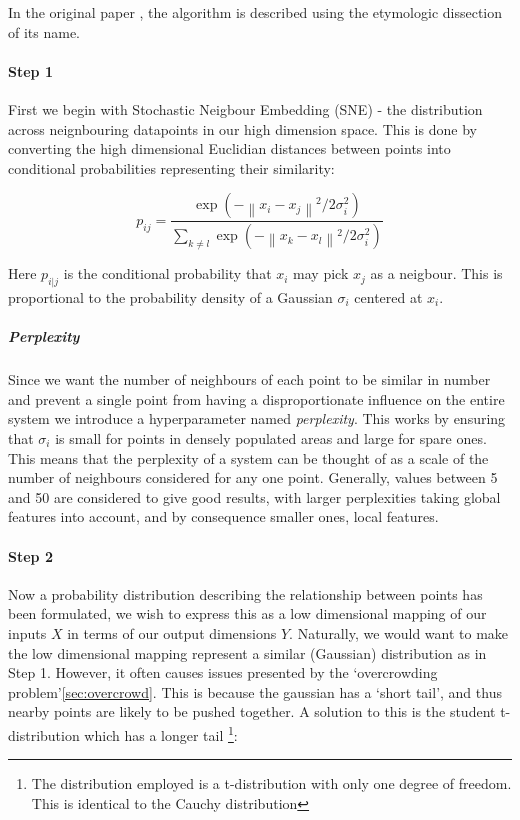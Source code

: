 In the original paper \cite{tsne}, the algorithm is described using the etymologic dissection of its name.

\paragraph{Step 1}
First we begin with Stochastic Neigbour Embedding (SNE) - the distribution across neignbouring datapoints in our high dimension space. This is done by converting the high dimensional Euclidian distances between points into conditional probabilities representing their similarity:

\begin{equation}
p_{ij} = \frac{\exp(-\left \| x_i - x_j \right \|^2 / 2\sigma_i^2)}{\sum_{k \neq l} \exp(- \left \| x_k - x_l \right \|^2 / 2\sigma_i^2)}
\end{equation}

Here $p_{i|j}$ is the conditional probability that $x_i$ may pick $x_j$ as a neigbour. This is proportional to the probability density of a Gaussian $\sigma_i$ centered at $x_i$.

\subparagraph{Perplexity}
Since we want the number of neighbours of each point to be similar in number and prevent a single point from having a disproportionate influence on the entire system we introduce a hyperparameter named \emph{perplexity}. This works by ensuring that $\sigma_i$ is small for points in densely populated areas and large for spare ones. This means that the perplexity of a system can be thought of as a scale of the number of neighbours considered for any one point. Generally, values between 5 and 50 are considered to give good results, with larger perplexities taking global features into account, and by consequence smaller ones, local features.

\paragraph{Step 2}
Now a probability distribution describing the relationship between points has been formulated, we wish to express this as a low dimensional mapping of our inputs $X$ in terms of our output dimensions $Y$. Naturally, we would want to make the low dimensional mapping represent a similar (Gaussian) distribution as in Step 1. However, it often causes issues presented by the `overcrowding problem'\autoref{sec:overcrowd}. This is because the gaussian has a `short tail', and thus nearby points are likely to be pushed together. A solution to this is the student t-distribution which has a longer tail \footnote{The distribution employed is a t-distribution with only one degree of freedom. This is identical to the Cauchy distribution}:

